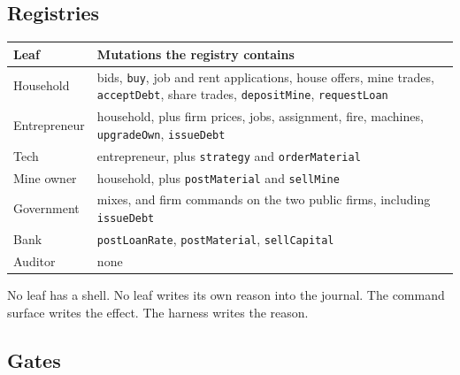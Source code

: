 \documentclass[11pt]{article}
\begin{document}
\subsection{Registries}

\begin{center}
\small
\begin{tabular}{@{}lp{9.2cm}@{}}
\toprule
Leaf & Mutations the registry contains \\
\midrule
Household &
bids, \texttt{buy}, job and rent applications, house offers,
mine trades, \texttt{acceptDebt}, share trades, \texttt{depositMine},
\texttt{requestLoan} \\
Entrepreneur &
household, plus firm prices, jobs, assignment, fire, machines,
\texttt{upgradeOwn}, \texttt{issueDebt} \\
Tech &
entrepreneur, plus \texttt{strategy} and \texttt{orderMaterial} \\
Mine owner &
household, plus \texttt{postMaterial} and \texttt{sellMine} \\
Government &
mixes, and firm commands on the two public firms, including
\texttt{issueDebt} \\
Bank &
\texttt{postLoanRate}, \texttt{postMaterial}, \texttt{sellCapital} \\
Auditor &
none \\
\bottomrule
\end{tabular}
\end{center}

No leaf has a shell. No leaf writes its own reason into the journal. The
command surface writes the effect. The harness writes the reason.

\subsection{Gates}
\label{sec:gates}
\end{document}
